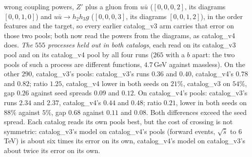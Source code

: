 \documentclass[11pt]{article}
\begin{document}
wrong coupling powers, $Z'$ plus a gluon from $u\bar u$ ($[0,0,0,2]$, its diagrams $[0,0,1,0]$) and $u\bar u\to
h_2h_3g$ ($[0,0,0,3]$, its diagrams $[0,0,1,2]$), in the order features and the target, so every earlier catalog\_v3
arm carries that error on those two pools; both now read the powers from the diagrams, as catalog\_v4 does.
\emph{The $555$ processes held out in both catalogs}, each read on its catalog\_v3 pool and on its catalog\_v4 pool
by all four runs ($265$ with a $b$ apart: the two pools of such a process are different functions, $4.7$\,GeV
against massless). On the other $290$, catalog\_v3's pools: catalog\_v3's runs $0.36$ and $0.40$, catalog\_v4's
$0.78$ and $0.82$; ratio $1.25$, catalog\_v4 lower in both seeds on $21\%$, catalog\_v3 on $54\%$, gap $0.26$ against
seed spreads $0.09$ and $0.12$. On catalog\_v4's pools: catalog\_v3's runs $2.34$ and $2.37$, catalog\_v4's $0.44$
and $0.48$; ratio $0.21$, lower in both seeds on $88\%$ against $5\%$, gap $0.68$ against $0.11$ and $0.08$. Both
differences exceed the seed spread. Each catalog reads its own pools best, but the cost of crossing is not symmetric:
catalog\_v3's model on catalog\_v4's pools (forward events, $\sqrt{\hat s}$ to $6$\,TeV) is about six times its error on
its own, catalog\_v4's model on catalog\_v3's about twice its error on its own.
\end{document}
